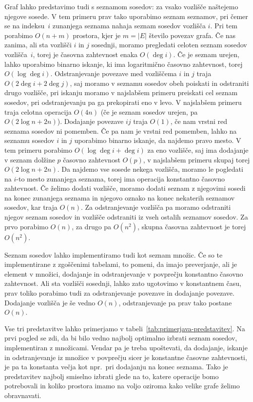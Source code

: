 \documentclass[12pt,a4paper,twoside]{article}
\theoremstyle{definition} %
\theoremstyle{plain} %
\numberwithin{equation}{section}  %
\begin{document}
Graf lahko predstavimo tudi s seznamom sosedov: za vsako vozlišče naštejemo njegove sosede. V tem primeru prav tako uporabimo seznam seznamov, pri čemer se na indeksu~$i$ zunanjega seznama nahaja seznam sosedov vozlišča $i$. Pri tem porabimo $O(n+m)$ prostora, kjer je $m = |E|$ število povezav grafa. Če nas zanima, ali sta vozlišči $i$ in $j$ sosednji, moramo pregledati celoten seznam sosedov vozlišča~$i$, torej je časovna zahtevnost enaka $O(\deg i)$. Če je seznam urejen, lahko uporabimo binarno iskanje, ki ima logaritmično časovno zahtevnost, torej $O(\log \deg i)$. Odstranjevanje povezave med vozliščema $i$ in $j$ traja $O(2 \deg i + 2 \deg j)$, saj moramo v seznamu sosedov obeh poiskati in odstraniti drugo vozlišče, pri iskanju moramo v najslabšem primeru preiskati cel seznam sosedov, pri odstranjevanju pa ga prekopirati eno v levo. V najslabšem primeru traja celotna operacija $O(4n)$ (če je seznam sosedov urejen, pa $O(2\log n + 2n)$). Dodajanje povezave $ij$ traja $O(1)$, če nam vrstni red seznama sosedov ni pomemben. Če pa nam je vrstni red pomemben, lahko na seznamu sosedov $i$ in $j$ uporabimo binarno iskanje, da najdemo pravo mesto. V tem primeru porabimo $O(\log \deg i + \deg i)$ za eno vozlišče, saj ima dodajanje v seznam dolžine $p$ časovno zahtevnost $O(p)$, v najslabšem primeru skupaj torej $O(2 \log n + 2 n)$. Da najdemo vse sosede nekega vozlišča, moramo le pogledati na $i$-to mesto zunanjega seznama, torej ima operacija konstantno časovno zahtevnost. Če želimo dodati vozlišče, moramo dodati seznam z njegovimi sosedi na konec zunanjega seznama in njegovo oznako na konec nekaterih seznamov sosedov, kar traja $O(n)$. Za odstranjevanje vozlišča pa moramo odstraniti njegov seznam sosedov in vozlišče odstraniti iz vseh ostalih seznamov sosedov. Za prvo porabimo $O(n)$, za drugo pa $O(n^2)$, skupna časovna zahtevnost je torej $O(n^2)$.

Seznam sosedov lahko implementiramo tudi kot seznam množic. Če so te implementirane z zgoščenimi tabelami, to pomeni, da imajo preverjanje, ali je element v množici, dodajanje in odstranjevanje v povprečju konstantno časovno zahtevnost. Ali sta vozlišči sosednji, lahko zato ugotovimo v konstantnem času, prav toliko porabimo tudi za odstranjevanje povezave in dodajanje povezave. Dodajanje vozlišča je še vedno $O(n)$, odstranjevanje pa prav tako postane $O(n)$. 

Vse tri predstavitve lahko primerjamo v tabeli~\ref{tab:primerjava-predstavitev}.
Na prvi pogled se zdi, da bi bilo vedno najbolj optimalno izbrati seznam sosedov, implementiran z množicami. Vendar pa je treba upoštevati, da dodajanje, iskanje in odstranjevanje iz množice v povprečju sicer je konstantne časovne zahtevnosti, je pa ta konstanta večja kot npr.~pri dodajanju na konec seznama. Tako je predstavitev najbolj smiselno izbrati glede na to, katere operacije bomo potrebovali in koliko prostora imamo na voljo oziroma kako velike grafe želimo obravnavati. 
\end{document}
